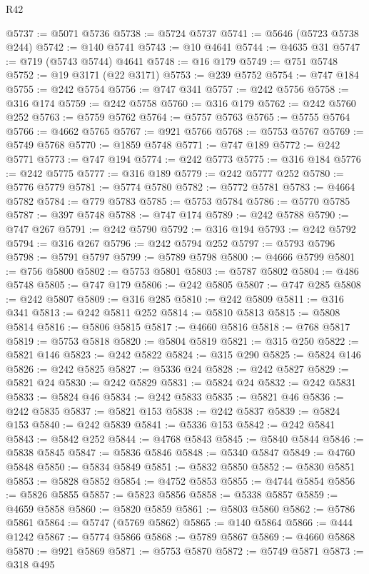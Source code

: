 \begin{lexlean}{R42}
\begin{coremodule}
{@5737 := @5071 @5736
@5738 := @5724 @5737
@5741 := @5646 (@5723 @5738 @244)
@5742 := @140 @5741
@5743 := @10 @4641
@5744 := @4635 @31
@5747 := @719 (@5743 @5744) @4641
@5748 := @16 @179
@5749 := @751 @5748
@5752 := @19 @3171 (@22 @3171)
@5753 := @239 @5752
@5754 := @747 @184
@5755 := @242 @5754
@5756 := @747 @341
@5757 := @242 @5756
@5758 := @316 @174
@5759 := @242 @5758
@5760 := @316 @179
@5762 := @242 @5760 @252
@5763 := @5759 @5762
@5764 := @5757 @5763
@5765 := @5755 @5764
@5766 := @4662 @5765
@5767 := @921 @5766
@5768 := @5753 @5767
@5769 := @5749 @5768
@5770 := @1859 @5748
@5771 := @747 @189
@5772 := @242 @5771
@5773 := @747 @194
@5774 := @242 @5773
@5775 := @316 @184
@5776 := @242 @5775
@5777 := @316 @189
@5779 := @242 @5777 @252
@5780 := @5776 @5779
@5781 := @5774 @5780
@5782 := @5772 @5781
@5783 := @4664 @5782
@5784 := @779 @5783
@5785 := @5753 @5784
@5786 := @5770 @5785
@5787 := @397 @5748
@5788 := @747 @174
@5789 := @242 @5788
@5790 := @747 @267
@5791 := @242 @5790
@5792 := @316 @194
@5793 := @242 @5792
@5794 := @316 @267
@5796 := @242 @5794 @252
@5797 := @5793 @5796
@5798 := @5791 @5797
@5799 := @5789 @5798
@5800 := @4666 @5799
@5801 := @756 @5800
@5802 := @5753 @5801
@5803 := @5787 @5802
@5804 := @486 @5748
@5805 := @747 @179
@5806 := @242 @5805
@5807 := @747 @285
@5808 := @242 @5807
@5809 := @316 @285
@5810 := @242 @5809
@5811 := @316 @341
@5813 := @242 @5811 @252
@5814 := @5810 @5813
@5815 := @5808 @5814
@5816 := @5806 @5815
@5817 := @4660 @5816
@5818 := @768 @5817
@5819 := @5753 @5818
@5820 := @5804 @5819
@5821 := @315 @250
@5822 := @5821 @146
@5823 := @242 @5822
@5824 := @315 @290
@5825 := @5824 @146
@5826 := @242 @5825
@5827 := @5336 @24
@5828 := @242 @5827
@5829 := @5821 @24
@5830 := @242 @5829
@5831 := @5824 @24
@5832 := @242 @5831
@5833 := @5824 @46
@5834 := @242 @5833
@5835 := @5821 @46
@5836 := @242 @5835
@5837 := @5821 @153
@5838 := @242 @5837
@5839 := @5824 @153
@5840 := @242 @5839
@5841 := @5336 @153
@5842 := @242 @5841
@5843 := @5842 @252
@5844 := @4768 @5843
@5845 := @5840 @5844
@5846 := @5838 @5845
@5847 := @5836 @5846
@5848 := @5340 @5847
@5849 := @4760 @5848
@5850 := @5834 @5849
@5851 := @5832 @5850
@5852 := @5830 @5851
@5853 := @5828 @5852
@5854 := @4752 @5853
@5855 := @4744 @5854
@5856 := @5826 @5855
@5857 := @5823 @5856
@5858 := @5338 @5857
@5859 := @4659 @5858
@5860 := @5820 @5859
@5861 := @5803 @5860
@5862 := @5786 @5861
@5864 := @5747 (@5769 @5862)
@5865 := @140 @5864
@5866 := @444 @1242
@5867 := @5774 @5866
@5868 := @5789 @5867
@5869 := @4660 @5868
@5870 := @921 @5869
@5871 := @5753 @5870
@5872 := @5749 @5871
@5873 := @318 @495
}
\end{coremodule}
\end{lexlean}
